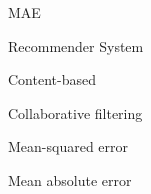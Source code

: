 \documentclass[cic,tc,english]{iiufrgs}
\begin{document}






\listoffigures

\listoftables

\begin{listofabbrv}{MAE}
    \item[RS] Recommender System
    \item[CB] Content-based
    \item[CF] Collaborative filtering
    \item[MSE] Mean-squared error
    \item[MAE] Mean absolute error
\end{listofabbrv}

\end{document}
